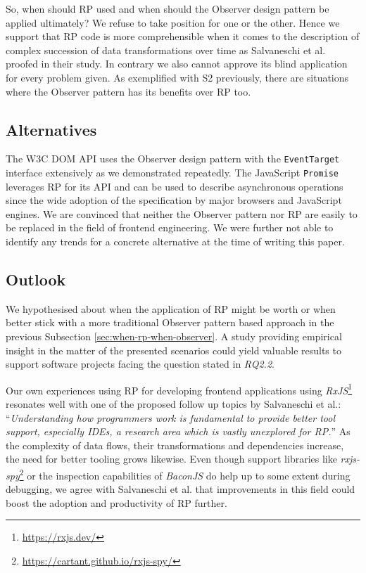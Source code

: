 \documentclass[12pt,a4paper]{article}
\begin{document}
So, when should RP used and when should the Observer design pattern be applied ultimately? We refuse to take position for one or the other. Hence we support that RP code is more comprehensible when it comes to the description of complex succession of data transformations over time as Salvaneschi et al. proofed in their study. In contrary we also cannot approve its blind application for every problem given. As exemplified with S2 previously, there are situations where the Observer pattern has its benefits over RP too.

\subsection{Alternatives}

The W3C DOM API uses the Observer design pattern with the \texttt{EventTarget} interface extensively as we demonstrated repeatedly. The JavaScript \texttt{Promise} leverages RP for its API and can be used to describe asynchronous operations since the wide adoption of the specification by major browsers and JavaScript engines. We are convinced that neither the Observer pattern nor RP are easily to be replaced in the field of frontend engineering. We were further not able to identify any trends for a concrete alternative at the time of writing this paper.

\subsection{Outlook}

We hypothesised about when the application of RP might be worth or when better stick with a more traditional Observer pattern based approach in the previous Subsection \ref{sec:when-rp-when-observer}. A study providing empirical insight in the matter of the presented scenarios could yield valuable results to support software projects facing the question stated in \emph{RQ2.2}.

Our own experiences using RP for developing frontend applications using \emph{RxJS}\footnote{\url{https://rxjs.dev/}} resonates well with one of the proposed follow up topics by Salvaneschi et al.: ``\emph{Understanding how programmers work is fundamental to provide better tool support, especially IDEs, a research area which is vastly unexplored for RP.}''\cite{7827078} As the complexity of data flows, their transformations and dependencies increase, the need for better tooling grows likewise. Even though support libraries like \emph{rxjs-spy}\footnote{\url{https://cartant.github.io/rxjs-spy/}} or the inspection capabilities of \emph{BaconJS} do help up to some extent during debugging, we agree with Salvaneschi et al. that improvements in this field could boost the adoption and productivity of RP further.
\end{document}
